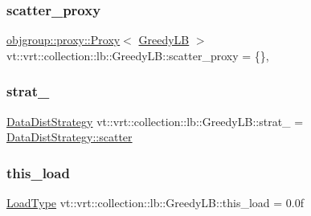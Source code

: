 \subsubsection{\texorpdfstring{scatter\+\_\+proxy}{scatter\_proxy}}
{\footnotesize\ttfamily \hyperlink{structvt_1_1objgroup_1_1proxy_1_1_proxy}{objgroup\+::proxy\+::\+Proxy}$<$ \hyperlink{structvt_1_1vrt_1_1collection_1_1lb_1_1_greedy_l_b}{Greedy\+LB} $>$ vt\+::vrt\+::collection\+::lb\+::\+Greedy\+L\+B\+::scatter\+\_\+proxy = \{\}\hspace{0.3cm}{\ttfamily [static]}, {\ttfamily [private]}}

\mbox{\label{structvt_1_1vrt_1_1collection_1_1lb_1_1_greedy_l_b_a41cd413b052ad6fb98fea034472fe31f}} 
\subsubsection{\texorpdfstring{strat\+\_\+}{strat\_}}
{\footnotesize\ttfamily \hyperlink{namespacevt_1_1vrt_1_1collection_1_1lb_a0c49bf89a59ba0fd5160bc3894417dfa}{Data\+Dist\+Strategy} vt\+::vrt\+::collection\+::lb\+::\+Greedy\+L\+B\+::strat\+\_\+ = \hyperlink{namespacevt_1_1vrt_1_1collection_1_1lb_a0c49bf89a59ba0fd5160bc3894417dfaa50894a237d9bcde0a18769af9a768baf}{Data\+Dist\+Strategy\+::scatter}\hspace{0.3cm}{\ttfamily [private]}}

\mbox{\label{structvt_1_1vrt_1_1collection_1_1lb_1_1_greedy_l_b_ab63d0de2d5e6c22d2a0c5e6c627a4949}} 
\subsubsection{\texorpdfstring{this\+\_\+load}{this\_load}}
{\footnotesize\ttfamily \hyperlink{namespacevt_a8fb51741340b87d7aaee0bef60e9896b}{Load\+Type} vt\+::vrt\+::collection\+::lb\+::\+Greedy\+L\+B\+::this\+\_\+load = 0.\+0f\hspace{0.3cm}{\ttfamily [private]}}

